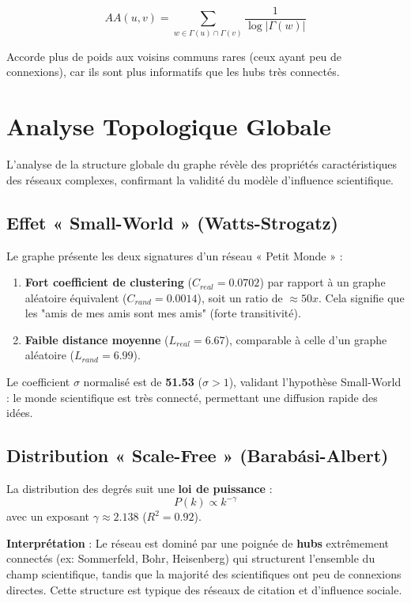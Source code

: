 \documentclass[12pt,a4paper]{report}
\begin{document}
$$AA(u, v) = \sum_{w \in \Gamma(u) \cap \Gamma(v)} \frac{1}{\log |\Gamma(w)|}$$

Accorde plus de poids aux voisins communs rares (ceux ayant peu de connexions), car ils sont plus informatifs que les hubs très connectés.

\section{Analyse Topologique Globale}

L'analyse de la structure globale du graphe révèle des propriétés caractéristiques des réseaux complexes, confirmant la validité du modèle d'influence scientifique.

\subsection{Effet « Small-World » (Watts-Strogatz)}

Le graphe présente les deux signatures d'un réseau « Petit Monde » :
\begin{enumerate}
    \item \textbf{Fort coefficient de clustering} ($C_{real} = 0.0702$) par rapport à un graphe aléatoire équivalent ($C_{rand} = 0.0014$), soit un ratio de $\approx 50x$. Cela signifie que les "amis de mes amis sont mes amis" (forte transitivité).
    \item \textbf{Faible distance moyenne} ($L_{real} = 6.67$), comparable à celle d'un graphe aléatoire ($L_{rand} = 6.99$).
\end{enumerate}

Le coefficient $\sigma$ normalisé est de \textbf{51.53} ($\sigma > 1$), validant l'hypothèse Small-World : le monde scientifique est très connecté, permettant une diffusion rapide des idées.

\subsection{Distribution « Scale-Free » (Barabási-Albert)}

La distribution des degrés suit une \textbf{loi de puissance} :
$$P(k) \propto k^{-\gamma}$$
avec un exposant $\gamma \approx 2.138$ ($R^2 = 0.92$).

\textbf{Interprétation} : Le réseau est dominé par une poignée de \textbf{hubs} extrêmement connectés (ex: Sommerfeld, Bohr, Heisenberg) qui structurent l'ensemble du champ scientifique, tandis que la majorité des scientifiques ont peu de connexions directes. Cette structure est typique des réseaux de citation et d'influence sociale.
\end{document}
